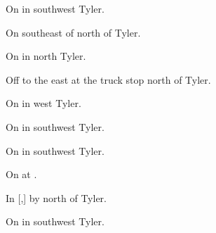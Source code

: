
\begin{LocationList}

On  in southwest Tyler.

On  southeast of  north of Tyler.

On  in north Tyler.

Off  to the east at the  truck stop north of Tyler.

On  in west Tyler.

On  in southwest Tyler.

On  in southwest Tyler.

\Location{\TruckService \Service}
On  at .

\Location{\TruckStop \Gas \Rest \Weigh}
In [,] by   north of Tyler.

On  in southwest Tyler.

\end{LocationList}
